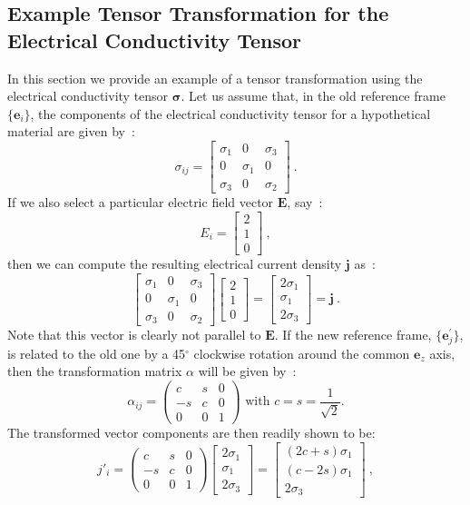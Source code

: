 \subsection{Example Tensor Transformation for the Electrical Conductivity Tensor}
In this section we provide an example of a tensor transformation using the electrical conductivity tensor $\bm{\sigma}$. Let us assume that, in the old reference frame $\{\mathbf{e}_i\}$, the components of the electrical conductivity tensor for a hypothetical material are given by~:
\[
\sigma_{ij}=\begin{bmatrix}\sigma_1 & 0 & \sigma_3\\
0 & \sigma_1 & 0\\
\sigma_3 & 0 & \sigma_2\end{bmatrix}\ .
\]
If we also select a particular electric field vector $\mathbf{E}$, say~:
\[
E_i=\begin{bmatrix} 2\\ 1\\ 0\end{bmatrix}\ ,
\]
then we can compute the resulting electrical current density $\mathbf{j}$ as~:
\[
\begin{bmatrix}\sigma_1 & 0 & \sigma_3\\
0 & \sigma_1 & 0\\
\sigma_3 & 0 & \sigma_2\end{bmatrix} \begin{bmatrix} 2\\ 1\\ 0\end{bmatrix}  = \begin{bmatrix} 2\sigma_1\\ \sigma_1\\ 2\sigma_3\end{bmatrix} =\mathbf{j}\ .
\]
Note that this vector is clearly not parallel to $\mathbf{E}$. If the new reference frame, $\{\mathbf{e}^{\prime}_j\}$, is related to the old one by a 45$^{\circ}$ clockwise rotation around the common $\mathbf{e}_z$ axis, then the transformation matrix $\alpha$ will be given by~:
\[
	\alpha_{ij}=\begin{pmatrix}c & s & 0\\ -s & c & 0\\ 0 & 0 & 1\end{pmatrix}\text{ with } c=s=\frac{1}{\sqrt{2}}.
\] 
The transformed vector components are then readily shown to be:
\[
	j'_i = \begin{pmatrix}c & s & 0\\ -s & c & 0\\ 0 & 0 & 1\end{pmatrix} \begin{bmatrix} 2\sigma_1\\ \sigma_1\\ 2\sigma_3\end{bmatrix} = 
	\begin{bmatrix} (2c+s)\sigma_1\\ (c-2s)\sigma_1\\ 2\sigma_3\end{bmatrix}\ ,
\]
